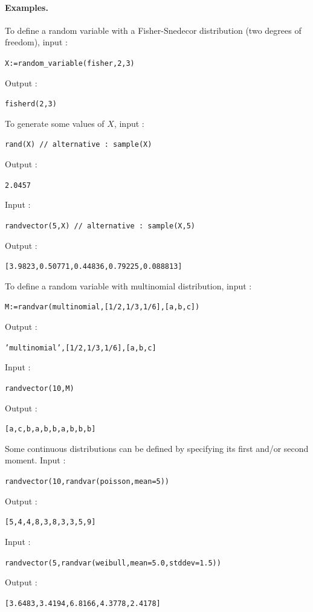 \paragraph{Examples.} To define a random variable with a Fisher-Snedecor distribution (two degrees of freedom), input :
\begin{center}
  \tt X:=random\_variable(fisher,2,3)
\end{center}
Output :
\begin{center}
  \tt fisherd(2,3)
\end{center}
To generate some values of $X$, input :
\begin{center}
  \tt rand(X) // alternative : sample(X)
\end{center}
Output :
\begin{center}
  \tt 2.0457
\end{center}
Input :
\begin{center}
  \tt randvector(5,X) // alternative : sample(X,5)
\end{center}
Output :
\begin{center}
  \tt [3.9823,0.50771,0.44836,0.79225,0.088813]
\end{center}
To define a random variable with multinomial distribution, input :
\begin{center}
  \tt M:=randvar(multinomial,[1/2,1/3,1/6],[a,b,c])
\end{center}
Output :
\begin{center}
  \tt 'multinomial',[1/2,1/3,1/6],[a,b,c]
\end{center}
Input :
\begin{center}
  \tt randvector(10,M)
\end{center}
Output :
\begin{center}
  \tt [a,c,b,a,b,b,a,b,b,b]
\end{center}
Some continuous distributions can be defined by specifying its first and/or second moment. Input :
\begin{center}
  \tt randvector(10,randvar(poisson,mean=5))
\end{center}
Output :
\begin{center}
  \tt [5,4,4,8,3,8,3,3,5,9]
\end{center}
Input :
\begin{center}
  \tt randvector(5,randvar(weibull,mean=5.0,stddev=1.5))
\end{center}
Output :
\begin{center}
  \tt [3.6483,3.4194,6.8166,4.3778,2.4178]
\end{center}
